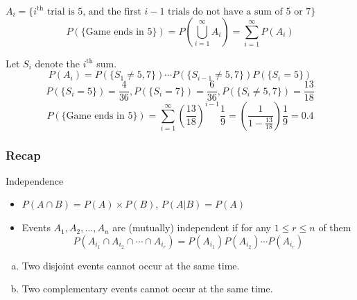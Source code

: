 \documentclass[slidestop,compress,mathserif]{beamer}
\begin{document}
\begin{frame}%

\pause
$A_i= \{ i^{\text{th}} \text{ trial is 5, and the first } i-1 \text{ trials do not have a sum of 5 or 7}\}$
\[ P(\{\text{Game ends in 5}\}) = P(\bigcup_{i=1}^{\infty} A_i) = \sum_{i=1}^{\infty} P(A_i)\]

\pause
Let $S_i$ denote the $i^{\text{th}}$ sum.
\[ P(A_i) = P(\{S_1 \neq 5, 7\}) \cdots P(\{S_{i-1} \neq 5, 7\})P(\{S_i =5\}) \]
\pause
\[ P(\{S_i =  5\}) = \frac{4}{36}, P(\{S_i = 7\}) = \frac{6}{36}, P(\{S_i \neq 5, 7\}) = \frac{13}{18}\]
\pause
\[ P(\{\text{Game ends in 5}\}) = \sum_{i=1}^{\infty} \left(\frac{13}{18}\right)^{i-1}\frac{1}{9} = \left(\frac{1}{1-\frac{13}{18}}\right)\frac{1}{9} = 0.4 \]


\end{frame}



%
%
%




\begin{frame}\frametitle{Recap}

Independence
\begin{itemize}
\item $P(A \cap B) = P(A) \times P(B)$,  $P(A|B) = P(A)$
\item Events $A_1, A_2, \ldots, A_n$ are (mutually) independent if
for any $1\leq r \leq n$ of them
 \[P(A_{i_1} \cap A_{i_2} \cap \cdots \cap A_{i_r}) = P(A_{i_1}) P(A_{i_2})  \cdots P(A_{i_r})\]

\end{itemize}


\begin{enumerate}[(a)]
\item Two disjoint events cannot occur at the same time.
\item Two complementary events cannot occur at the same time.
\end{enumerate}


\end{frame}
\end{document}
